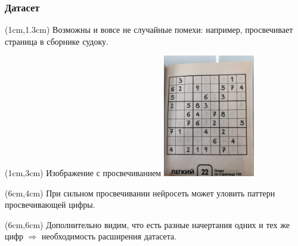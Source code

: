 \documentclass{beamer}
\begin{document}
\begin{frame}
\frametitle{Датасет}

\begin{textblock*}{10cm}(1cm,1.3cm)
Возможны и вовсе не случайные помехи: например, просвечивает страница в сборнике судоку.
\end{textblock*}

\begin{textblock*}{4cm}(1cm,3cm)
\tiny Изображение с просвечиванием
\includegraphics[width=4cm]{sudoku_8_through}
\end{textblock*}

\begin{textblock*}{5cm}(6cm,4cm)
\small При сильном просвечивании нейросеть может уловить паттерн просвечивающей цифры.
\end{textblock*}

\begin{textblock*}{5cm}(6cm,6cm)
\small Дополнительно видим, что есть разные начертания одних и тех же цифр $\Rightarrow$ необходимость расширения датасета.
\end{textblock*}

\end{frame}
\end{document}

